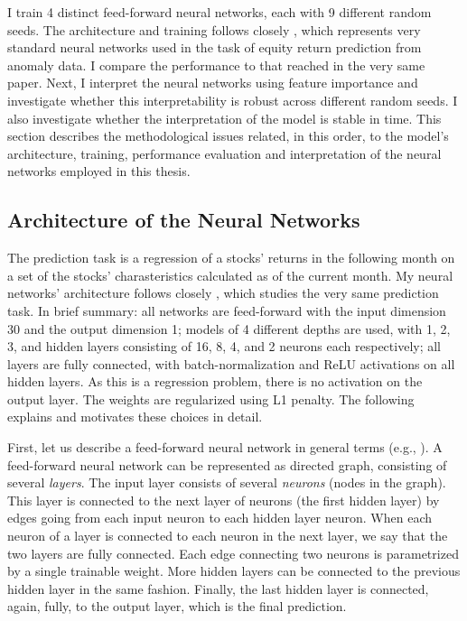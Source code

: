 	I train 4 distinct feed-forward neural networks, each with 9 different random seeds. The architecture and training follows closely \cite{gu2020empirical}, which represents very standard neural networks used in the task of equity return prediction from anomaly data. I compare the performance to that reached in the very same paper. Next, I interpret the neural networks using feature importance and investigate whether this interpretability is robust across different random seeds. I also investigate whether the interpretation of the model is stable in time. This  section describes the methodological issues related, in this order, to the model's architecture, training, performance evaluation and interpretation of the neural networks employed in this thesis.
	
	\subsection{Architecture of the Neural Networks}
		\label{chap:architecture}
	
		The prediction task is a regression of a stocks' returns in the following month on a set of the stocks' charasteristics calculated as of the current month. My neural networks' architecture follows closely \cite{gu2020empirical}, which studies the very same prediction task. In brief summary: all networks are feed-forward with the input dimension 30 and the output dimension 1; models of 4 different depths are used, with 1, 2, 3, and hidden layers consisting of 16, 8, 4, and 2 neurons each respectively; all layers are fully connected, with batch-normalization \citep{ioffe2015batch} and ReLU activations on all hidden layers. As this is a regression problem, there is no activation on the output layer. The weights are regularized using L1 penalty. The following explains and motivates these choices in detail.
		
		First, let us describe a feed-forward neural network in general terms (e.g., \cite{goodfellow2016deep}). A feed-forward neural network can be represented as directed graph, consisting of several \textit{layers}. The input layer consists of several \textit{neurons} (nodes in the graph). This layer is connected to the next layer of neurons (the first hidden layer) by edges going from each input neuron to each hidden layer neuron. When each neuron of a layer is connected to each neuron in the next layer, we say that the two layers are fully connected. Each edge connecting two neurons is parametrized by a single trainable weight. More hidden layers can be connected to the previous hidden layer in the same fashion. Finally, the last hidden layer is connected, again, fully, to the output layer, which is the final prediction.
		
